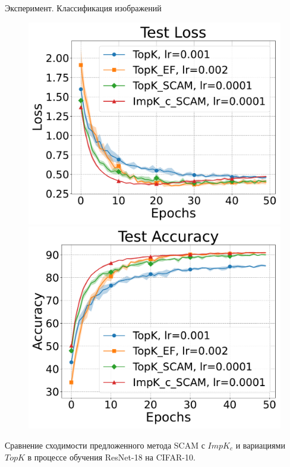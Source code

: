 \documentclass{beamer}
\begin{document}
\begin{frame}{Эксперимент. Классификация изображений}
\begin{figure}[ht]
\begin{minipage}{0.4\textwidth}
        \end{minipage}
        \begin{minipage}{0.4\textwidth}
            \includegraphics[width=\textwidth]{../paper/figures/resnet/experiment2/Test Loss.pdf}
        \end{minipage}
        \begin{minipage}{0.4\textwidth}
            \includegraphics[width=\textwidth]{../paper/figures/resnet/experiment2/Test Accuracy.pdf}
        \end{minipage}
    \end{figure}
    Сравнение сходимости предложенного метода SCAM с $ImpK_c$ и вариациями $TopK$ в процессе обучения ResNet-18 на CIFAR-10.

\end{frame}
\end{document}
